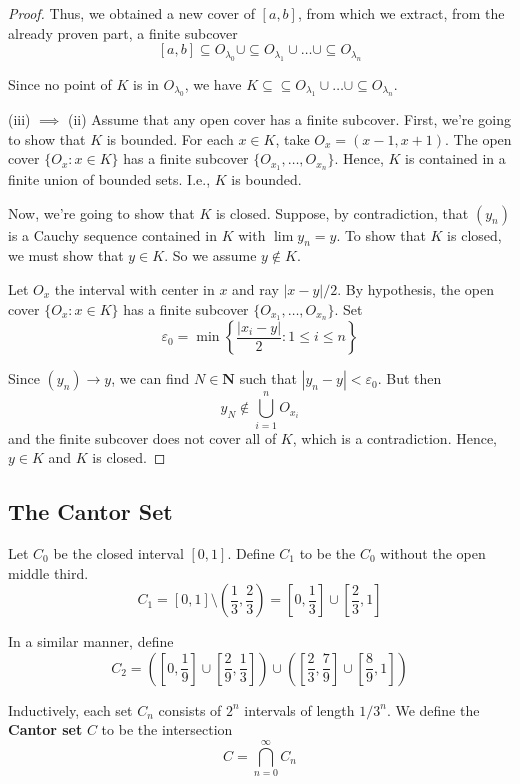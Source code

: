 \documentclass[12pt,a4paper]{article}
\theoremstyle{definition}
\begin{document}
\begin{proof}
	Thus, we obtained a new cover of $[a,b]$, from which we extract, from the already proven part, a finite subcover
	\[
		[a,b] \subseteq O_{\lambda_0} \cup \subseteq O_{\lambda_1} \cup \ldots \cup \subseteq O_{\lambda_n}
	\]
	
	Since no point of $K$ is in $O_{\lambda_0}$, we have $K \subseteq \subseteq O_{\lambda_1} \cup \ldots \cup \subseteq O_{\lambda_n}$.
	
	(iii) $\implies$ (ii) Assume that any open cover has a finite subcover. First, we're going to show that $K$ is bounded. For each $x \in K$, take $O_x = (x-1, x+1)$. The open cover $\{O_x : x \in K\}$ has a finite subcover $\{ O_{x_1}, \ldots, O_{x_n} \}$. Hence, $K$ is contained in a finite union of bounded sets. I.e., $K$ is bounded.
	
	Now, we're going to show that $K$ is closed. Suppose, by contradiction, that $(y_n)$ is a Cauchy sequence contained in $K$ with $\lim y_n = y$. To show that $K$ is closed, we must show that $y \in K$. So we assume $y \notin K$.
	
	Let $O_x$ the interval with center in $x$ and ray $|x-y|/2$. By hypothesis, the open cover $\{O_x : x \in K\}$ has a finite subcover $\{ O_{x_1}, \ldots, O_{x_n} \}$. Set
	\[
		\varepsilon_0 = \min \left\{ \frac{|x_i - y|}{2} : 1 \leq i \leq n \right\}
	\]
	
	Since $(y_n) \to y$, we can find $N \in \textbf{N}$ such that $|y_n - y| < \varepsilon_0$. But then 
	\[
		y_N \notin \bigcup_{i=1}^n O_{x_i} 
	\]
	and the finite subcover does not cover all of $K$, which is a contradiction. Hence, $y \in K$ and $K$ is closed.
\end{proof}

\subsection{The Cantor Set}

Let $C_0$ be the closed interval $[0,1]$. Define $C_1$ to be the $C_0$ without the open middle third.
\[
	C_1 = [0,1] \setminus \left( \frac{1}{3}, \frac{2}{3} \right) = \left[0, \frac{1}{3} \right] \cup \left[\frac{2}{3}, 1 \right]
\]

In a similar manner, define
\[
	C_2 = \left(  \left[0, \frac{1}{9} \right] \cup  \left[\frac{2}{9}, \frac{1}{3} \right] \right) \cup   \left(  \left[\frac{2}{3}, \frac{7}{9} \right] \cup  \left[\frac{8}{9}, 1 \right] \right)
\]

Inductively, each set $C_n$ consists of $2^n$ intervals of length $1/3^n$. We define the \textbf{Cantor set} $C$ to be the intersection
\[
	C = \bigcap_{n=0}^\infty C_n
\]
\end{document}
